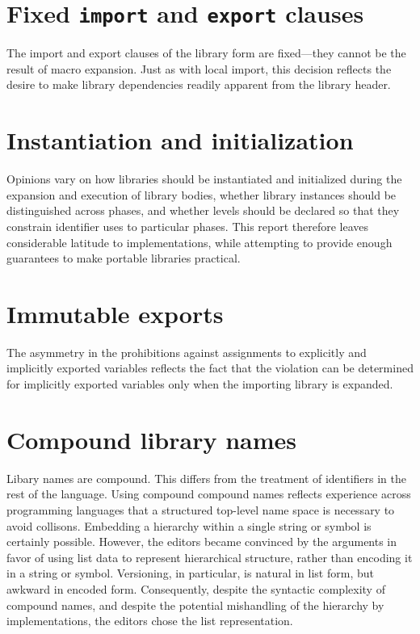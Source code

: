 \documentclass[twoside,twocolumn]{algol60}
\begin{document}
\section{Fixed {\tt import} and {\tt export} clauses}

The {\cf import} and {\cf export} clauses of the {\cf library} form
are fixed---they cannot be the result of macro expansion.  Just as
with local import, this decision reflects the desire to make library
dependencies readily apparent from the library header.

\section{Instantiation and initialization}

Opinions vary on how libraries should be instantiated and
initialized during the expansion and execution of library bodies,
whether library instances should be distinguished across phases,
and whether levels should be declared so that they constrain 
identifier uses to particular phases. This report therefore leaves
considerable latitude to implementations, while attempting to
provide enough guarantees to make portable libraries practical.

\section{Immutable exports}

The asymmetry in the prohibitions against assignments to explicitly
and implicitly exported variables reflects the fact that the violation
can be determined for implicitly exported variables only when the
importing library is expanded.

\section{Compound library names}

Libary names are compound.  This differs from the treatment of
identifiers in the rest of the language.  Using compound compound
names reflects experience across programming languages that a
structured top-level name space is necessary to avoid collisons.
Embedding a hierarchy within a single string or symbol is certainly
possible. However, the editors became convinced by the arguments in
favor of using list data to represent hierarchical structure, rather
than encoding it in a string or symbol.  Versioning, in particular, is
natural in list form, but awkward in encoded form.  Consequently,
despite the syntactic complexity of compound names, and despite the
potential mishandling of the hierarchy by implementations, the editors
chose the list representation.
\end{document}
